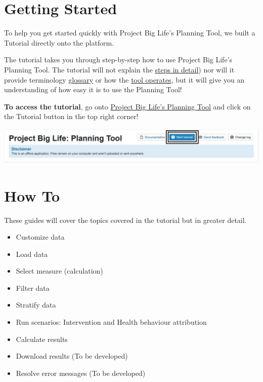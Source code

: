 \documentclass[]{book}
\providecommand{\tightlist}{%
  \setlength{\itemsep}{0pt}\setlength{\parskip}{0pt}}
\begin{document}
\hypertarget{getting-started}{%
\chapter{Getting Started}\label{getting-started}}

To help you get started quickly with Project Big Life's Planning Tool, we built a Tutorial directly onto the platform.

The tutorial takes you through step-by-step how to use Project Big Life's Planning Tool. The tutorial will not explain the \protect\hyperlink{howto}{steps in detail}) nor will it provide terminology \protect\hyperlink{glossary}{glossary} or how the \protect\hyperlink{mport}{tool operates}, but it will give you an understanding of how easy it is to use the Planning Tool!

\textbf{To access the tutorial}, go onto \href{http://planning.projectbiglife.ca/}{Project Big Life's Planning Tool} and click on the Tutorial button in the top right corner!

\begin{center}\includegraphics{Images/Tutorial Button} \end{center}

\hypertarget{howto}{%
\chapter{How To}\label{howto}}

These guides will cover the topics covered in the tutorial but in greater detail.

\begin{itemize}
\tightlist
\item
  Customize data
\item
  Load data
\item
  Select measure (calculation)
\item
  Filter data
\item
  Stratify data
\item
  Run scenarios: Intervention and Health behaviour attribution
\item
  Calculate results
\item
  Download results (To be developed)
\item
  Resolve error messages (To be developed)
\end{itemize}
\end{document}
